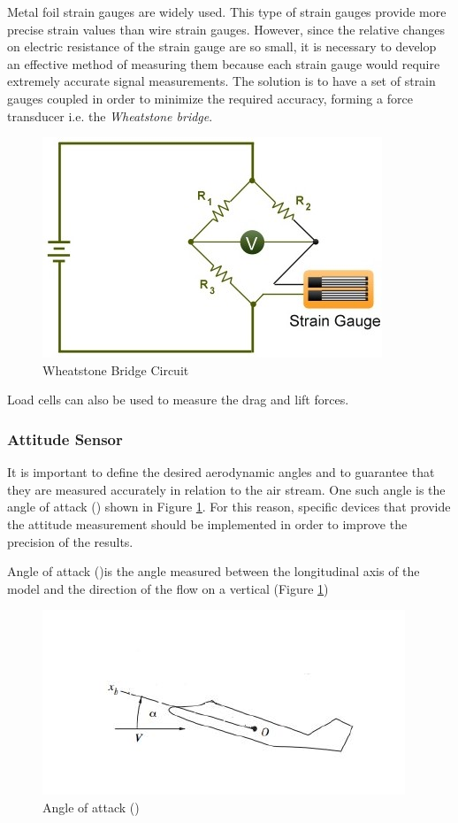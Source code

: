 Metal foil strain gauges are widely used. This type of strain gauges provide more precise strain values than wire strain gauges. However, since the relative changes on electric resistance of the strain gauge are so small, it is necessary to develop an effective method of measuring them because each strain gauge would require extremely accurate signal measurements. The solution is to have a set of strain gauges coupled in order to minimize the required accuracy, forming a force transducer i.e. the \textit{Wheatstone bridge}.
\begin{center}
	\begin{figure}[H]
		\centering
		\includegraphics[width=0.6\linewidth]{Figures/Fig9}
		\caption[Wheatstone Bridge Circuit]{Wheatstone Bridge Circuit \cite{ferreira2015design}}
	\end{figure}
\end{center}
Load cells can also be used to measure the drag and lift forces\cite{ferreira2015design}.
\subsubsection{Attitude Sensor}
It is important to define the desired aerodynamic angles and to guarantee that they are measured accurately in relation to the air stream. One such angle is the angle of attack (\textalpha) shown in Figure \ref{att}. For this reason, specific devices that provide the attitude measurement should be implemented in order to improve the precision of the results.

Angle of attack (\textalpha)is the angle measured between the longitudinal axis of the model and the direction of the flow on a vertical (Figure \ref{att})
\begin{center}
	\begin{figure}[H]
		\centering
		\includegraphics[width=0.6\linewidth]{Figures/Fig10}
		\caption[Angle of attack]{Angle of attack (\textalpha) \cite{ferreira2015design}}
		\label{att}
	\end{figure}
\end{center}

